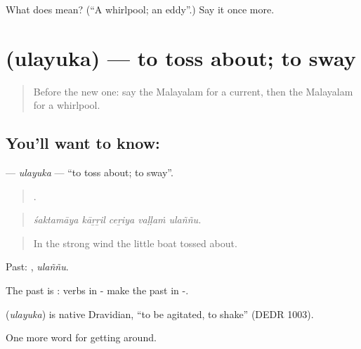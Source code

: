 \begin{tcolorbox}[breakable,colback=teal!4,colframe=teal!35!black,title={Before you move on}]
What does  mean? (\textquotedblleft{}A whirlpool; an eddy\textquotedblright{}.) Say it once more.
\end{tcolorbox}
\section[\texorpdfstring{\ml{ഉലയുക} (ulayuka)}{ഉലയുക (ulayuka)}]{ (ulayuka) — to toss about; to sway}

\label{lesson:ML-C476-ulayuka}



\begin{quote}
Before the new one: say the Malayalam for a current, then the Malayalam for a whirlpool.
\end{quote}

\subsection*{You'll want to know: }
\textbf{} — \emph{ulayuka} — \textquotedblleft{}to toss about; to sway\textquotedblright{}.

\begin{quote}
    .
\end{quote}

\begin{quote}
\emph{śaktamāya kāṟṟil ceṟiya vaḷḷaṁ ulaññu.}
\end{quote}

\begin{quote}
In the strong wind the little boat tossed about.
\end{quote}

Past: , \emph{ulaññu}.

The past is : verbs in - make the past in -.

\begin{cousinweb}
\textbf{} (\emph{ulayuka}) is native Dravidian, \textquotedblleft{}to be agitated, to shake\textquotedblright{} (DEDR 1003).
\end{cousinweb}

\begin{grammarlens}[title={What you've built}]
One more word for getting around.
\end{grammarlens}

